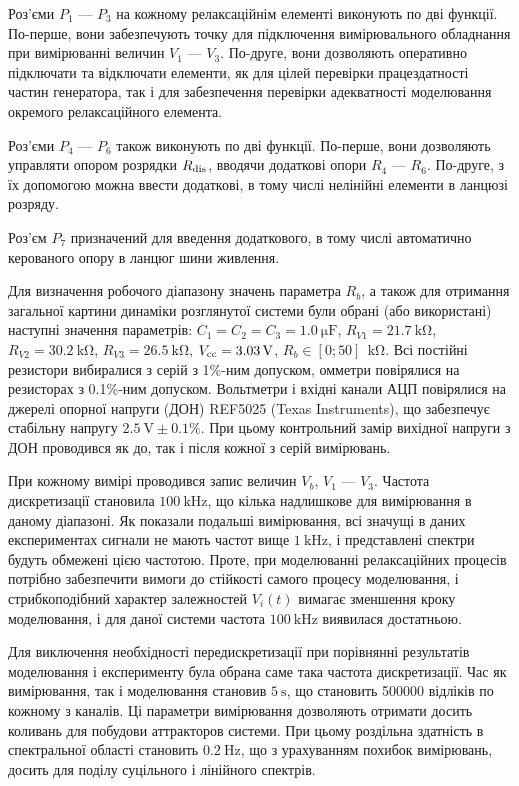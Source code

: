 Роз'єми
$ P_1 $ --- $ P_3 $ на кожному релаксаційнім елементі виконують по дві
функції. По-перше, вони забезпечують точку для підключення
вимірювального обладнання при вимірюванні величин
$ V_1 $ --- $ V_3 $. По-друге, вони дозволяють оперативно підключати та
відключати елементи, як для цілей перевірки працездатності
частин генератора, так і для забезпечення перевірки
адекватності моделювання окремого релаксаційного елемента.


Роз'єми
$P_4$ --- $ P_6 $ також виконують по дві функції. По-перше, вони дозволяють
управляти опором розрядки
$R _\mathrm{dis} $, вводячи додаткові опори 
$R_4$ --- $R_6$. По-друге, з їх допомогою можна ввести додаткові, в тому
числі нелінійні елементи в ланцюзі розряду.

Роз'єм
$ P_7 $ призначений для введення додаткового, в тому числі
автоматично керованого опору в ланцюг шини живлення.

Для визначення робочого діапазону значень параметра
$ R_b $, а також для отримання загальної картини динаміки
розглянутої системи були обрані (або використані) наступні
значення параметрів:
$C_1 = C_2 = C_3 = \SI{1.0}{\micro\farad}$,
$R_{V1} = \SI{21.7}{\kilo\ohm}$,
$R_{V2} = \SI{30.2}{\kilo\ohm}$,
$R_{V3} = \SI{26.5}{\kilo\ohm}$,
$V_\mathrm{cc} = \SI{3.03}{\volt}$,
$R_{b} \in [0;50]~ \SI{}{\kilo\ohm}$.
Всі постійні резистори вибиралися з серій з 1\%-ним допуском,
омметри повірялися на резисторах з 0.1\%-ним допуском. Вольтметри
і вхідні канали АЦП повірялися на джерелі опорної напруги (ДОН)
REF5025 (Texas Instruments), що забезпечує стабільну напругу
$\SI{2.5}{\volt} \pm 0.1 \% $. При цьому контрольний замір вихідної напруги
з ДОН проводився як до, так і після кожної з серій вимірювань.

При кожному вимірі проводився запис величин
$ V_b $, $ V_1 $ --- $ V_3 $. Частота дискретизації становила
$ \SI{100}{\kilo \hertz} $, що кілька надлишкове для вимірювання в даному
діапазоні. Як показали подальші вимірювання, всі значущі в
даних експериментах сигнали не мають частот вище
$ \SI{1}{\kilo \hertz} $, і представлені спектри будуть обмежені цією
частотою. Проте, при моделюванні релаксаційних процесів
потрібно забезпечити вимоги до стійкості самого процесу
моделювання, і стрибкоподібний характер залежностей
$ V_i (t) $ вимагає зменшення кроку моделювання, і для даної системи
частота
$ \SI{100}{\kilo \hertz} $ виявилася достатньою.

Для виключення необхідності передискретизації при порівнянні
результатів моделювання і експерименту була обрана саме така
частота дискретизації. Час як вимірювання, так і моделювання
становив
$ \SI{5}{\s} $, що становить 500000 відліків по кожному з каналів. Ці
параметри вимірювання дозволяють отримати досить коливань для
побудови аттракторов системи. При цьому роздільна здатність в спектральної
області становить
$ \SI{0.2}{\hertz} $, що з урахуванням похибок вимірювань, досить для
поділу суцільного і лінійного спектрів.


